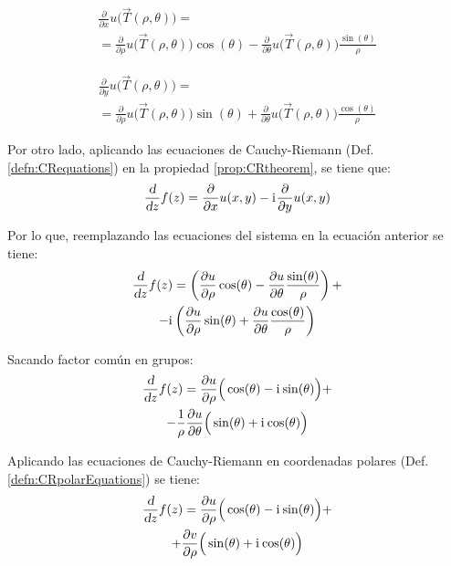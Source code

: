 \documentclass[a5paper,12pt,twoside]{book}
\begin{document}
\begin{multline*}
    \frac{\partial}{\partial x} u \Big( \Vec{T}(\rho,\theta) \Big) =
    \\
    = \frac{\partial}{\partial \rho} u \Big( \Vec{T}(\rho,\theta) \Big) \cos(\theta) - \frac{\partial}{\partial \theta} u \Big( \Vec{T}(\rho,\theta) \Big) \frac{\sin(\theta)}{\rho}
\end{multline*}

\begin{multline*}
    \frac{\partial}{\partial y} u \Big( \Vec{T}(\rho,\theta) \Big) =
    \\
    = \frac{\partial}{\partial \rho} u \Big( \Vec{T}(\rho,\theta) \Big) \sin(\theta) + \frac{\partial}{\partial \theta} u \Big( \Vec{T}(\rho,\theta) \Big) \frac{\cos(\theta)}{\rho}
\end{multline*}

Por otro lado, aplicando las ecuaciones de Cauchy-Riemann (Def. \ref{defn:CRequations}) en la propiedad \ref{prop:CRtheorem}, se tiene que:
\begin{equation*}
    \frac{\textsl{d}}{\textsl{d} z} f(z) = \frac{\partial}{\partial x} u(x,y) - \mathrm{i}\mkern1mu \frac{\partial}{\partial y} u(x,y)
\end{equation*}

Por lo que, reemplazando las ecuaciones del sistema en la ecuación anterior se tiene:
\begin{multline*}
    \frac{\textsl{d}}{\textsl{d} z} f(z) = \left( \frac{\partial u}{\partial \rho} \cos(\theta) - \frac{\partial u}{\partial \theta} \frac{\sin(\theta)}{\rho} \right) +
    \\
    - \mathrm{i}\mkern1mu \left( \frac{\partial u}{\partial \rho} \sin(\theta) + \frac{\partial u}{\partial \theta} \frac{\cos(\theta)}{\rho} \right)
\end{multline*}

Sacando factor común en grupos:
\begin{multline*}
    \frac{\textsl{d}}{\textsl{d} z} f(z) = \frac{\partial u}{\partial \rho} \Big( \cos(\theta) - \mathrm{i}\mkern1mu \sin(\theta) \Big) +
    \\
    - \frac{1}{\rho} \frac{\partial u}{\partial \theta} \Big( \sin(\theta) + \mathrm{i}\mkern1mu \cos(\theta) \Big)
\end{multline*}

Aplicando las ecuaciones de Cauchy-Riemann en coordenadas polares (Def. \ref{defn:CRpolarEquations}) se tiene:
\begin{multline*}
    \frac{\textsl{d}}{\textsl{d} z} f(z) = \frac{\partial u}{\partial \rho} \Big( \cos(\theta) - \mathrm{i}\mkern1mu \sin(\theta) \Big) +
    \\
    + \frac{\partial v}{\partial \rho} \Big( \sin(\theta) + \mathrm{i}\mkern1mu \cos(\theta) \Big)
\end{multline*}
\end{document}
